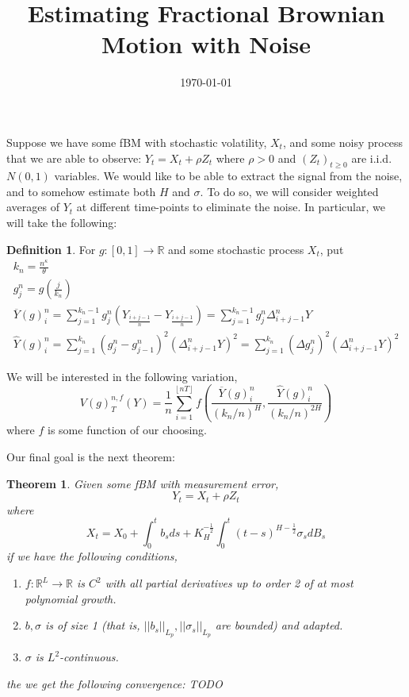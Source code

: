 \documentclass[12pt,letterpaper]{article}
\title{Estimating Fractional Brownian Motion with Noise}
\author{}
\date{\today}
\newtheorem*{theorem}{Theorem}
\theoremstyle{lemma}
\theoremstyle{definition}
\newtheorem*{definition}{Definition}
\newcommand{\R}{\mathbb{R}}
\begin{document}
\maketitle

Suppose we have some fBM with stochastic volatility, \(X_t\), and some noisy process that we are able to observe: \(Y_t = X_t + \rho Z_t\) where \(\rho > 0\) and \((Z_t)_{t \geq 0}\) are i.i.d. \(N(0,1)\) variables. We would like to be able to extract the signal from the noise, and to somehow estimate both \(H\) and \(\sigma\). To do so, we will consider weighted averages of \(Y_t\) at different time-points to eliminate the noise. In particular, we will take the following:

\begin{definition}
  For \(g: [0,1] \rightarrow \R\) and some stochastic process \(X_t\), put
  \begin{gather}
    k_n = \frac{n^\kappa}{\theta} \\
    g^n_j = g\left( \frac{j}{k_n} \right) \\
    \overline{Y}(g)^n_i = \sum_{j=1}^{k_n-1}g^n_j\left( Y_{\frac{i+j-1}{n}} - Y_{\frac{i+j-1}{n}} \right) = \sum_{j=1}^{k_n-1}g^n_j\Delta_{i+j-1}^n Y \\
    \widehat{Y}(g)^n_i = \sum_{j=1}^{k_n}\left(g^n_j - g^n_{j-1}\right)^2\left(\Delta_{i+j-1}^n Y\right)^2 = \sum_{j=1}^{k_n}\left(\Delta g^n_j\right)^2\left(\Delta_{i+j-1}^n Y\right)^2
  \end{gather}
\end{definition}

We will be interested in the following variation,
\begin{equation}
  V(g)^{n,f}_T(Y) = \frac{1}{n}\sum_{i=1}^{\left\lfloor nT \right\rfloor}f\left( \frac{\overline{Y}(g)^n_i}{\left( k_n/n \right)^H}, \frac{\widehat{Y}(g)^n_i}{\left( k_n/n \right)^{2H}} \right)
\end{equation}
where \(f\) is some function of our choosing.

Our final goal is the next theorem:
\begin{theorem}
  Given some fBM with measurement error, 
  \begin{equation}
    Y_t = X_t + \rho Z_t
  \end{equation}
  where
  \begin{equation}
    X_t = X_0 + \int_0^tb_sds + K_H^{-\frac{1}{2}}\int_0^t(t-s)^{H - \frac{1}{2}}\sigma_sdB_s
  \end{equation}
  if we have the following conditions,
  \begin{enumerate}
    \item \(f: \R^L \rightarrow \R\) is \(C^2\) with all partial derivatives up to order 2 of at most polynomial growth.
    \item \(b, \sigma\) is of size 1 (that is, \(||b_s||_{L_p}, ||\sigma_s||_{L_p}\) are bounded) and adapted.
    \item \(\sigma\) is \(L^2\)-continuous.
  \end{enumerate}
  the we get the following convergence:
  TODO
\end{theorem}
\end{document}
